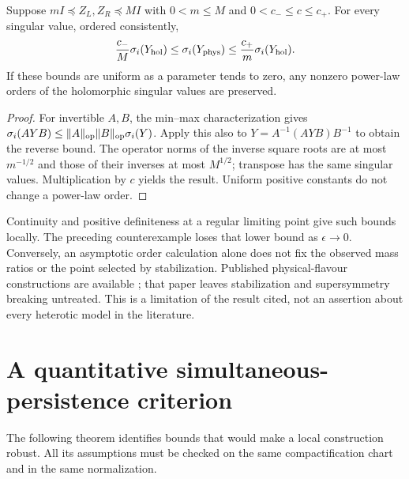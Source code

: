 \begin{proposition}\label{prop:bounded}
Suppose $mI\preceq Z_L,Z_R\preceq MI$ with $0<m\le M$ and
$0<c_-\le c\le c_+$. For every singular value, ordered consistently,
\[
 \frac{c_-}{M}\sigma_i(Y_{\rm hol})
 \le\sigma_i(Y_{\rm phys})
 \le\frac{c_+}{m}\sigma_i(Y_{\rm hol}).
\]
If these bounds are uniform as a parameter tends to zero, any nonzero
power-law orders of the holomorphic singular values are preserved.
\end{proposition}
\begin{proof}
For invertible $A,B$, the min--max characterization gives
$\sigma_i(AYB)\le\|A\|_{\rm op}\|B\|_{\rm op}\sigma_i(Y)$.
Apply this also to $Y=A^{-1}(AYB)B^{-1}$ to obtain the reverse bound.
The operator norms of the inverse square roots are at most $m^{-1/2}$
and those of their inverses at most $M^{1/2}$; transpose has the same
singular values. Multiplication by $c$ yields the result. Uniform positive
constants do not change a power-law order.
\end{proof}
Continuity and positive definiteness at a regular limiting point give
such bounds locally. The preceding counterexample loses that lower bound
as $\epsilon\to0$. Conversely, an asymptotic order calculation alone does
not fix the observed mass ratios or the point selected by stabilization.
Published physical-flavour constructions are available \cite{CLLN};
that paper leaves stabilization and supersymmetry breaking untreated.
This is a limitation of the result cited, not an assertion about every
heterotic model in the literature.

\section{A quantitative simultaneous-persistence criterion}
The following theorem identifies bounds that would make a local
construction robust. All its assumptions must be checked on the same
compactification chart and in the same normalization.

